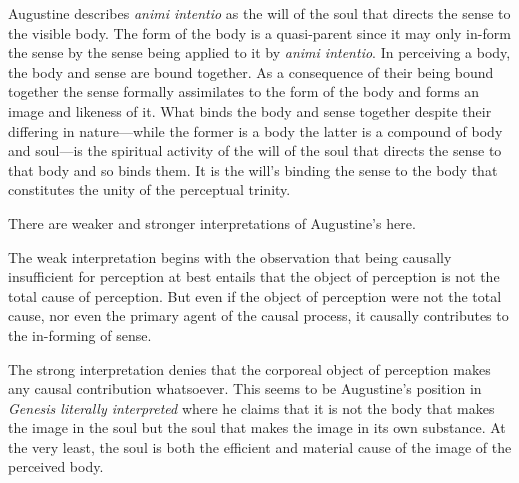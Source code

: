 \documentclass[12pt]{article}
\begin{document}
Augustine describes \emph{animi intentio} as the will of the soul that directs the sense to the visible body.
The form of the body is a quasi-parent since it may only in-form the sense by the sense being applied to it by \emph{animi intentio}. In perceiving a body, the body and sense are bound together. As a consequence of their being bound together the sense formally assimilates to the form of the body and forms an image and likeness of it. What binds the body and sense together despite their differing in nature---while the former is a body the latter is a compound of body and soul---is the spiritual activity of the will of the soul that directs the sense to that body and so binds them. It is the will's binding the sense to the body that constitutes the unity of the perceptual trinity.

There are weaker and stronger interpretations of Augustine's here. 

The weak interpretation begins with the observation that being causally insufficient for perception at best entails that the object of perception is not the total cause of perception. But even if the object of perception were not the total cause, nor even the primary agent of the causal process, it causally contributes to the in-forming of sense.

The strong interpretation denies that the corporeal object of perception makes any causal contribution whatsoever. This seems to be Augustine's position in \emph{Genesis literally interpreted} where he claims that it is not the body that makes the image in the soul but the soul that makes the image in its own substance. At the very least, the soul is both the efficient and material cause of the image of the perceived body.
\end{document}
